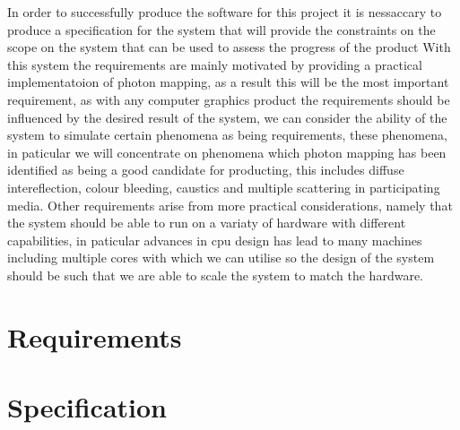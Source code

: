 In order to successfully produce the software for this project it is nessaccary to produce a specification for the system
that will provide the constraints on the scope on the system that can be used to assess the progress of the product
With this system the requirements are mainly motivated by providing a practical implementatoion of photon mapping, as a result
this will be the most important requirement, as with any computer graphics product the requirements should be influenced by the
desired result of the system, we can consider the ability of the system to simulate certain phenomena as being requirements,
these phenomena, in paticular we will concentrate on phenomena which photon mapping has been identified as being a good candidate
for producting, this includes diffuse intereflection, colour bleeding, caustics and multiple scattering in participating media.
Other requirements arise from more practical considerations, namely that the system should be able to run on a variaty of
hardware with different capabilities, in paticular advances in cpu design has lead to many machines including multiple cores
with which we can utilise so the design of the system should be such that we are able to scale the system to match the 
hardware.

\section{Requirements}

\section{Specification}

